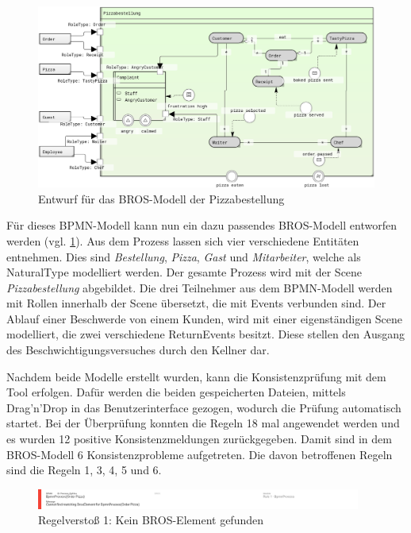 \begin{figure}
    \centering
    \includegraphics[width=\textwidth,keepaspectratio]{../images/example/bros-rule1.png}%
    \caption{Entwurf für das BROS-Modell der Pizzabestellung}%
    \label{fig:pizzaBros1}
\end{figure}

Für dieses BPMN-Modell kann nun ein dazu passendes BROS-Modell entworfen werden (vgl. \cref{fig:pizzaBros1}).
Aus dem Prozess lassen sich vier verschiedene Entitäten entnehmen.
Dies sind \emph{Bestellung}, \emph{Pizza}, \emph{Gast} und \emph{Mitarbeiter}, welche als NaturalType modelliert werden.
Der gesamte Prozess wird mit der Scene \emph{Pizzabestellung} abgebildet.
Die drei Teilnehmer aus dem BPMN-Modell werden mit Rollen innerhalb der Scene übersetzt, die mit Events verbunden sind.
Der Ablauf einer Beschwerde von einem Kunden, wird mit einer eigenständigen Scene modelliert, die zwei verschiedene ReturnEvents besitzt.
Diese stellen den Ausgang des Beschwichtigungsversuches durch den Kellner dar.

Nachdem beide Modelle erstellt wurden, kann die Konsistenzprüfung mit dem Tool erfolgen.
Dafür werden die beiden gespeicherten Dateien, mittels Drag'n'Drop in das Benutzerinterface gezogen, wodurch die Prüfung automatisch startet.
Bei der Überprüfung konnten die Regeln 18 mal angewendet werden und es wurden 12 positive Konsistenzmeldungen zurückgegeben.
Damit sind in dem BROS-Modell 6 Konsistenzprobleme aufgetreten.
Die davon betroffenen Regeln sind die Regeln 1, 3, 4, 5 und 6.

\begin{figure}[H]
    \centering
     \includegraphics[width=0.95\textwidth,keepaspectratio]{../images/example/error1.png}%
    \caption{Regelverstoß 1: Kein BROS-Element gefunden}%
    \label{fig:error1}
\end{figure}

